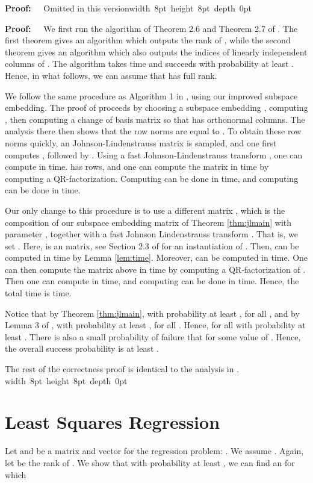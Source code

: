 \documentclass{sig-alternate}
\newcommand\STOComitedproof[1] {\ifSTOC \begin{proof} Omitted in this version\end{proof}\else #1 \fi }
\def\FullBox{\hbox{\vrule width 8pt height 8pt depth 0pt}}
\def\qed{\ifmmode\qquad\FullBox\else{\unskip\nobreak\hfil
\penalty50\hskip1em\null\nobreak\hfil\FullBox
\parfillskip=0pt\finalhyphendemerits=0\endgraf}\fi}
\newenvironment{proof}{\begin{trivlist} \item {\bf Proof:~~}}
  {\qed\end{trivlist}}
\begin{document}
\STOComitedproof{
\begin{proof}
We first run the algorithm of Theorem 2.6 and Theorem 2.7 of \cite{ckl12}. The first theorem 
gives an algorithm which outputs the rank  of , while the second theorem gives an algorithm
which also outputs the indices  of linearly independent columns of . The algorithm
takes  time and succeeds with probability at least .
Hence, in what follows, we can assume that  has full rank. 

We follow the same procedure as Algorithm 1 in \cite{dmmw11}, using our improved subspace embedding.
The proof of \cite{dmmw11} proceeds by choosing a subspace embedding , computing ,
then computing a change of basis matrix  so that  has orthonormal columns. The analysis
there then shows that the row norms  are equal to . To obtain
these row norms quickly, an  Johnson-Lindenstrauss matrix  is sampled,
and one first computes , followed by . Using a fast Johnson-Lindenstrauss transform
, one can compute  in  time.  has  rows, and
one can compute the  matrix  in  time by computing a 
QR-factorization. Computing 
can be done in  time, and computing  can be done in  time.

Our only change to this procedure is to use a different matrix , which is the composition
of our subspace embedding matrix  of Theorem \ref{thm:jlmain} with parameter , together with a fast
Johnson Lindenstrauss transform . That is, we set . Here,  is an
 matrix, see Section 2.3 of \cite{dmmw11} for an instantiation of . 
Then,  can be computed in  time by Lemma \ref{lem:time}. Moreover,
 can be computed in  time. One can then 
compute the matrix  above in  time by computing a QR-factorization of . Then
one can compute  in  time, and computing  can be done in 
 time.
Hence, the total time is  time. 

Notice that
by Theorem \ref{thm:jlmain}, with probability at least , 
 for all , and by
Lemma 3 of \cite{dmmw11}, with probability at least , 
 for all . Hence,
 for all  
with probability at least . There is
also a small  probability of failure that 
 for
some value of . Hence, the overall success probability is at least . 

The rest of the correctness proof is identical to the analysis in \cite{dmmw11}. 
\end{proof}
} 

\section{Least Squares Regression}\label{sec:regression}
Let  and  be a matrix and
vector for the regression problem: . We assume . Again,
let  be the rank of . 
We show that with probability at least , 
we can find an  for which
\end{document}
